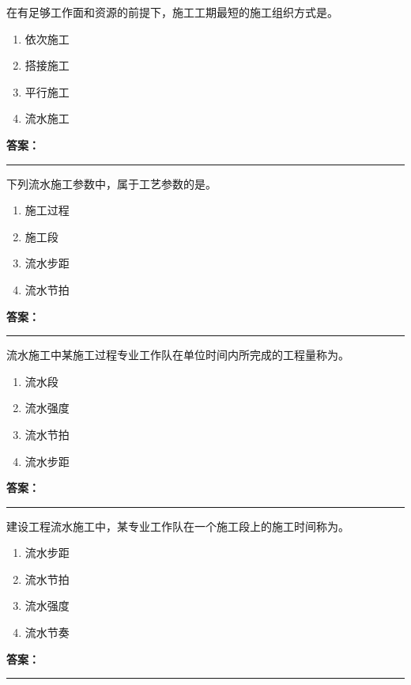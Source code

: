 \documentclass[UTF8,fontset=fandol,11pt]{ctexart}
\newcommand{\answerline}{\textcolor{answerred}{\rule{2.4cm}{0.7pt}}}
\begin{document}
\vspace{0.2em}

\begin{quizbox}[title={第 2 题}]
在有足够工作面和资源的前提下，施工工期最短的施工组织方式是。\\
\begin{enumerate}[label=\Alph*.]
\item 依次施工
\item 搭接施工
\item 平行施工
\item 流水施工
\end{enumerate}
\textbf{\textcolor{answerred}{答案：}} \answerline
\end{quizbox}

\vspace{0.2em}

\begin{quizbox}[title={第 3 题}]
下列流水施工参数中，属于工艺参数的是。\\
\begin{enumerate}[label=\Alph*.]
\item 施工过程
\item 施工段
\item 流水步距
\item 流水节拍
\end{enumerate}
\textbf{\textcolor{answerred}{答案：}} \answerline
\end{quizbox}

\vspace{0.2em}

\begin{quizbox}[title={第 4 题}]
流水施工中某施工过程专业工作队在单位时间内所完成的工程量称为。\\
\begin{enumerate}[label=\Alph*.]
\item 流水段
\item 流水强度
\item 流水节拍
\item 流水步距
\end{enumerate}
\textbf{\textcolor{answerred}{答案：}} \answerline
\end{quizbox}

\vspace{0.2em}

\begin{quizbox}[title={第 5 题}]
建设工程流水施工中，某专业工作队在一个施工段上的施工时间称为。\\
\begin{enumerate}[label=\Alph*.]
\item 流水步距
\item 流水节拍
\item 流水强度
\item 流水节奏
\end{enumerate}
\textbf{\textcolor{answerred}{答案：}} \answerline
\end{quizbox}
\end{document}
